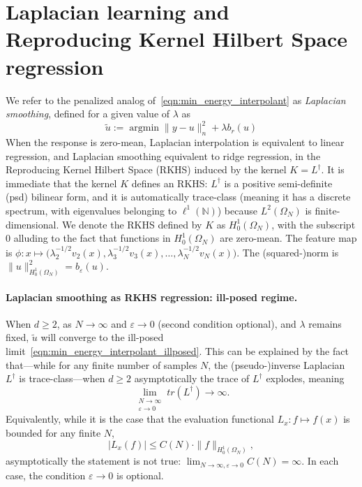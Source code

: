 \documentclass{article}
\newcommand{\1}{\mathbf{1}}
\DeclareMathOperator*{\argmin}{argmin}
\newcommand{\wt}[1]{\widetilde{#1}}
\theoremstyle{definition}
\theoremstyle{remark}
\begin{document}
\section{Laplacian learning and Reproducing Kernel Hilbert Space regression}
We refer to the penalized analog of~\eqref{eqn:min_energy_interpolant} as \emph{Laplacian smoothing}, defined for a given value of $\lambda$ as
\begin{equation}
\label{eqn:laplacian_smoothing}
\wt{u} := \argmin \|y - u\|_n^2 + \lambda b_r(u)
\end{equation}
When the response is zero-mean, Laplacian interpolation is equivalent to linear regression, and Laplacian smoothing equivalent to ridge regression, in the Reproducing Kernel Hilbert Space (RKHS) induced by the kernel $K = L^{\dagger}$. It is immediate that the kernel $K$ defines an RKHS: $L^{\dagger}$ is a positive semi-definite (psd) bilinear form, and it is automatically trace-class (meaning it has a discrete spectrum, with eigenvalues belonging to $\ell^1(\mathbb{N})$) because $L^2(\Omega_N)$ is finite-dimensional. We denote the RKHS defined by $K$ as $H_0^1(\Omega_N)$, with the subscript $0$ alluding to the fact that functions in $H_0^1(\Omega_N)$ are zero-mean. The feature map is $\phi: x \mapsto \bigl(\lambda_2^{-1/2} v_2(x),\lambda_3^{-1/2} v_3(x),\ldots,\lambda_N^{-1/2} v_N(x)\bigr)$. The (squared-)norm is $\|u\|_{H_0^1(\Omega_N)}^2 = b_{\varepsilon}(u)$. 

\paragraph{Laplacian smoothing as RKHS regression: ill-posed regime.}
When $d \geq 2$, as $N \to \infty$ and $\varepsilon \to 0$ (second condition optional), and $\lambda$ remains fixed, $\wt{u}$ will converge to the ill-posed limit~\eqref{eqn:min_energy_interpolant_illposed}. This can be explained by the fact that---while for any finite number of samples $N$, the (pseudo-)inverse Laplacian $L^{\dagger}$ is trace-class---when $d \geq 2$ asymptotically the trace of $L^{\dagger}$ explodes, meaning
\begin{equation*}
\lim_{\substack{N \to \infty \\ \varepsilon \to 0}} tr(L^{\dagger}) \to \infty.
\end{equation*}
Equivalently, while it is the case that the evaluation functional $L_x: f \mapsto f(x)$ is bounded for any finite $N$,
\begin{equation*}
|L_x(f)| \leq C(N) \cdot \|f\|_{H_0^1(\Omega_N)},
\end{equation*}
asymptotically the statement is not true: $\lim_{N \to \infty, \varepsilon \to 0} C(N) = \infty$. In each case, the condition $\varepsilon \to 0$ is optional.
\end{document}
